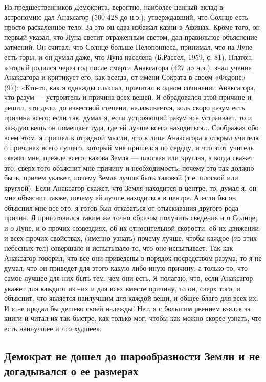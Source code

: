 Из предшественников Демокрита, вероятно, наиболее ценный вклад в
астрономию дал Анаксагор (500-428 до н.э.), утверждавший, что Солнце
есть просто раскаленное тело. За это он едва избежал казни в Афинах.
Кроме того, он первый указал, что Луна светит отраженным светом, дал
правильное объяснение затмений. Он считал, что Солнце больше
Пелопоннеса, принимал, что на Луне есть горы, и он думал даже, что
Луна населена (Б.Рассел, 1959, с. 81). Платон, который родился через
год после смерти Анаксагора (427 до н.э.), знал учение Анаксагора и
критикует его, как всегда, от имени Сократа в своем «Федоне» (97):
«Кто-то, как я однажды слышал, прочитал в одном сочинении Анаксагора,
что разум --- устроитель и причина всех вещей. Я обрадовался этой
причине и решил, что дело, до известной степени, налаживается, коль
скоро разум есть причина всего; если так, думал я, если устрояющий
разум все устраивает, то и каждую вещь он помещает туда, где ей лучше
всего находиться... Соображая обо всем этом, я пришел к отрадной
мысли, что в лице Анаксагора я открыл учителя о причинах всего сущего,
который мне пришелся по сердцу, и что этот учитель скажет мне, прежде
всего, какова Земля --- плоская или круглая, а когда скажет это, сверх
того объяснит мне причину и необходимость, почему это так должно быть,
причем укажет, почему Земле лучше быть таковой (т.е. плоской или
круглой). Если Анаксагор скажет, что Земля находится в центре, то,
думал я, он мне объяснит также, почему ей лучше находиться в центре. А
если бы он объяснил мне все это, я готов был отказаться от отыскивания
другого рода причин. Я приготовился таким же точно образом получить
сведения и о Солнце, и о Луне, и о прочих созвездиях, об их
относительной скорости, об их движении и всех прочих свойствах,
(именно узнать) почему лучше, чтобы каждое (из этих небесных тел)
совершало и испытывало то, что оно испытывает. Так как Анаксагор
говорил, что все они приведены в порядок посредством разума, то я не
думал, что он приведет для этого какую-либо иную причину, а только то,
что самое лучшее для них быть тем, чем они есть. Я полагаю, что, если
Анаксагор укажет для каждого из них и для всех вместе причину, то он,
сверх того, и объяснит, что является наилучшим для каждой вещи, и
общее благо для всех их. И я не продал бы дешево своей надежды! Нет, я
с большим рвением взялся за книги и читал их так быстро, как только
мог, чтобы как можно скорее узнать, что есть наилучшее и что худшее».

\subsection{Демократ не дошел до шарообразности Земли и не догадывался
о ее размерах}

